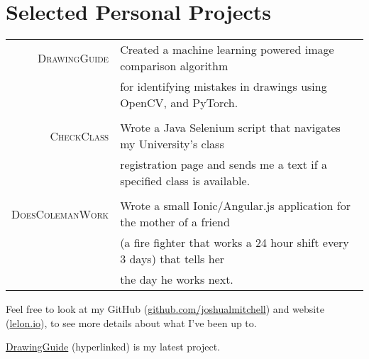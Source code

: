 \documentclass[a4paper,10pt]{article}
\begin{document}
\section{Selected Personal Projects}
\begin{tabular}{rl}
 \textsc{DrawingGuide} & Created a machine learning powered image comparison algorithm \\
 
 & 
 
for identifying mistakes in drawings using OpenCV, and PyTorch. \\

& \\
\textsc{CheckClass} & Wrote a Java Selenium script that navigates my University’s class \\
& registration page and sends me a text if a specified class is available. \\

& \\
\textsc{DoesColemanWork} & Wrote a small Ionic/Angular.js application for the mother of a friend \\
& (a fire fighter that works a 24 hour shift every 3 days) that tells her \\

& the day he works next. \\
\end{tabular}

Feel free to look at my GitHub (\href {https://github.com/joshualmitchell}{github.com/joshualmitchell}) and website (\href {http://lelon.io/blog/2018/01/04/to-potential-employers}{lelon.io}), to see more details about what I've been up to.

\href {https://github.com/joshualmitchell/DrawingGuide}{DrawingGuide} (hyperlinked) is my latest project.
\end{document}
